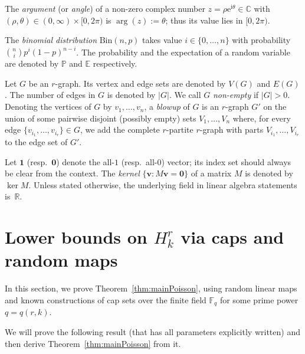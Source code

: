 \documentclass[12pt,a4paper]{article}
\numberwithin{equation}{section}
\theoremstyle{definition}
\theoremstyle{remark}
\newcommand{\V}[1]{\boldsymbol{#1}}
\newcommand{\me}{\mathrm{e}}
\begin{document}
The \emph{argument} (or \emph{angle}) of a non-zero complex number $z=\rho \me^{\mathrm{i}\theta}\in\mathbb C$ with $(\rho,\theta)\in (0,\infty)\times [0,2\pi)$ is 
$\arg(z):=\theta$; thus its value lies in $[0,2\pi)$.

The \emph{binomial distribution} $\mathrm{Bin}(n,p)$ takes value $i\in\{0,\dots,n\}$ with probability $\binom{n}{i}p^i(1-p)^{n-i}$. 
The probability and the expectation of a random variable are denoted by $\mathbb P$ and $\mathbb E$ respectively.


Let $G$ be an $r$-graph. Its vertex and edge sets are denoted by $V(G)$ and $E(G)$.  The number of edges in $G$ is denoted by $|G|$. We call $G$ \emph{non-empty} if $|G|>0$. %
Denoting the vertices of $G$ by $v_1,\dots,v_n$, 
a \emph{blowup} of $G$ is an $r$-graph $G'$ on the union of some pairwise disjoint (possibly empty) sets $V_1,\dots,V_n$ where, for every edge $\{v_{i_1},\dots,v_{i_r}\}\in G$, we add the complete $r$-partite $r$-graph with parts $V_{i_1},\dots,V_{i_r}$ to the edge set of $G'$.


Let $\mathbf 1$ (resp.\ $\V{0}$) denote the all-$1$ (resp.\ all-$0$) vector; its index set should always be clear from the context. The \emph{kernel} $\{\V{v}: M\V{v}=\V{0}\}$ of a matrix $M$ is denoted by $\ker M$. Unless stated otherwise, the underlying field in linear algebra statements is~$\mathbb R$.

\section{Lower bounds on \texorpdfstring{$H_k^r$}{Hkr} via caps and random maps}\label{sec:poisson}\label{sec:nolog}

In this section, we prove Theorem~\ref{thm:mainPoisson}, using random linear maps and known constructions of cap sets over the finite field $\mathbb F_q$ for some prime power $q=q(r,k)$.

We will prove the following result (that has all parameters explicitly written) and then derive Theorem~\ref{thm:mainPoisson} from it.
 
\end{document}
